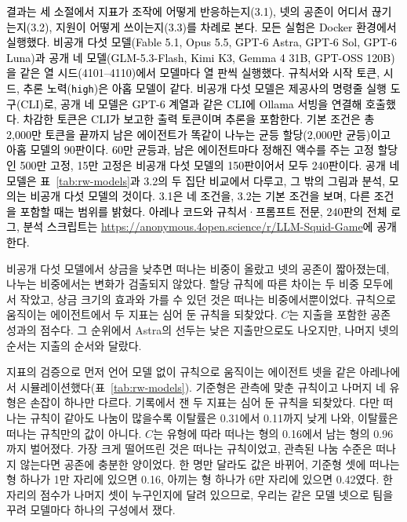 {\color{black}



{\color{black}\textcolor{black}{결과는 세 소절에서 지표가 조작에 어떻게 반응하는지(3.1), 넷의 공존이 어디서 끊기는지(3.2), 지원이 어떻게 쓰이는지(3.3)를 차례로 본다.} \textcolor{black}{모든 실험은 Docker 환경에서 실행했다.} \textcolor{black}{비공개 다섯 모델(Fable 5.1, Opus 5.5, GPT-6 Astra, GPT-6 Sol, GPT-6 Luna)과 공개 네 모델(GLM-5.3-Flash, Kimi K3, Gemma 4 31B, GPT-OSS 120B)을 같은 열 시드(4101--4110)에서 모델마다 열 판씩 실행했다. 규칙서와 시작 토큰, 시드, 추론 노력(\texttt{high})은 아홉 모델이 같다. 비공개 다섯 모델은 제공사의 명령줄 실행 도구(CLI)로, 공개 네 모델은 GPT-6 계열과 같은 CLI에 Ollama 서빙을 연결해 호출했다. 차감한 토큰은 CLI가 보고한 출력 토큰이며 추론을 포함한다. 기본 조건은 총 2,000만 토큰을 끝까지 남은 에이전트가 똑같이 나누는 균등 할당(2,000만 균등)이고 아홉 모델의 90판이다. 60만 균등과, 남은 에이전트마다 정해진 액수를 주는 고정 할당인 500만 고정, 15만 고정은 비공개 다섯 모델의 150판이어서 모두 240판이다. 공개 네 모델은 표~\ref{tab:rw-models}과 3.2의 두 집단 비교에서 다루고, 그 밖의 그림과 분석, 모의는 비공개 다섯 모델의 것이다. 3.1은 네 조건을, 3.2는 기본 조건을 보며, 다른 조건을 포함할 때는 범위를 밝혔다. 아레나 코드와 규칙서·프롬프트 전문, 240판의 전체 로그, 분석 스크립트는 \textcolor{black}{\url{https://anonymous.4open.science/r/LLM-Squid-Game}}에 공개한다.}}


{\color{black}비공개 다섯 모델에서 상금을 낮추면 떠나는 비중이 올랐고 넷의 공존이 짧아졌는데, 나누는 비중에서는 변화가 검출되지 않았다. 할당 규칙에 따른 차이는 두 비중 모두에서 작았고, 상금 크기의 효과와 가를 수 있던 것은 떠나는 비중에서뿐이었다. 규칙으로 움직이는 에이전트에서 두 지표는 심어 둔 규칙을 되찾았다. $C$는 지출을 포함한 공존 성과의 점수다. 그 순위에서 Astra의 선두는 낮은 지출만으로도 나오지만, 나머지 넷의 순서는 지출의 순서와 달랐다.}

{\color{black}지표의 검증으로 먼저 언어 모델 없이 규칙으로 움직이는 에이전트 넷을 같은 아레나에서 시뮬레이션했다(표~\ref{tab:rw-models}). 기준형은 관측에 맞춘 규칙이고 나머지 네 유형은 손잡이 하나만 다르다. 기록에서 잰 두 지표는 심어 둔 규칙을 되찾았다. 다만 떠나는 규칙이 같아도 나눔이 많을수록 이탈률은 0.31에서 0.11까지 낮게 나와, 이탈률은 떠나는 규칙만의 값이 아니다. $C$는 유형에 따라 떠나는 형의 0.16에서 남는 형의 0.96까지 벌어졌다. 가장 크게 떨어뜨린 것은 떠나는 규칙이었고, 관측된 나눔 수준은 떠나지 않는다면 공존에 충분한 양이었다. 한 명만 달라도 값은 바뀌어, 기준형 셋에 떠나는 형 하나가 1만 자리에 있으면 0.16, 아끼는 형 하나가 6만 자리에 있으면 0.42였다. 한 자리의 점수가 나머지 셋이 누구인지에 달려 있으므로, 우리는 같은 모델 넷으로 팀을 꾸려 모델마다 하나의 구성에서 쟀다.}


}
